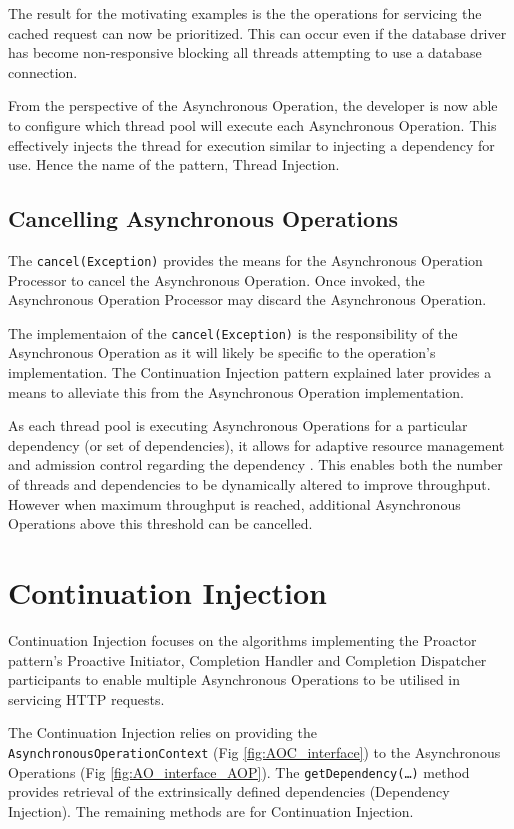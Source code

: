 \documentclass{article}
\begin{document}
The result for the motivating examples is the the operations for servicing the
cached request can now be prioritized.  This can occur even if the database
driver has become non-responsive blocking all threads attempting to use a
database connection.

From the perspective of the Asynchronous Operation, the developer is now able to
configure which thread pool will execute each Asynchronous Operation.  This
effectively injects the thread for execution similar to injecting a dependency
for use.  Hence the name of the pattern, Thread Injection.


\subsection{Cancelling Asynchronous Operations}

The \texttt{cancel(Exception)} provides the means for the Asynchronous Operation
Processor to cancel the Asynchronous Operation.  Once invoked, the Asynchronous
Operation Processor may discard the Asynchronous Operation.

The implementaion of the \texttt{cancel(Exception)} is the responsibility of the
Asynchronous Operation as it will likely be specific to the operation's
implementation.  The Continuation Injection pattern explained later provides a
means to alleviate this from the Asynchronous Operation implementation.

As each thread pool is executing Asynchronous Operations for a particular
dependency (or set of dependencies), it allows for adaptive resource management
and admission control regarding the dependency \cite{seda}.  This enables both
the number of threads and dependencies to be dynamically altered to improve
throughput.  However when maximum throughput is reached, additional Asynchronous
Operations above this threshold can be cancelled.


\section{Continuation Injection}

Continuation Injection focuses on the algorithms implementing the Proactor pattern's
Proactive Initiator, Completion Handler and Completion Dispatcher participants
to enable multiple Asynchronous Operations to be utilised in servicing HTTP
requests.

The Continuation Injection relies on providing the
\texttt{AsynchronousOperationContext} (Fig \ref{fig:AOC_interface}) to the
Asynchronous Operations (Fig
\ref{fig:AO_interface_AOP}).  The \texttt{getDependency(\ldots)}
method provides retrieval of the extrinsically defined dependencies (Dependency
Injection).  The remaining methods are for Continuation Injection.
\end{document}
